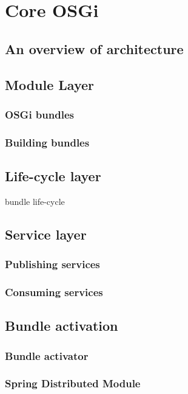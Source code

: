 \chapter{Core OSGi}

\section{An overview of architecture}

\section{Module Layer}

\subsection{OSGi bundles}
\subsection{Building bundles}


\section{Life-cycle layer}
bundle life-cycle

\section{Service layer}

\subsection{Publishing services}
\subsection{Consuming services}

\section{Bundle activation}
\subsection{Bundle activator}
\subsection{Spring Distributed Module}





 
